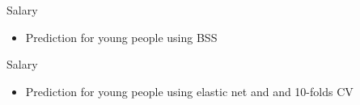 \documentclass[xcolor=dvipsnames]{beamer}
\begin{document}
\begin{frame}{\centerline{\huge\textcolor{bscuro}{Salary}}}
\begin{itemize}
	\item Prediction for young people using BSS 
\end{itemize}

\begin{figure}[!ht] 
	\centering
	\qquad
\end{figure}
\end{frame}

\begin{frame}{\centerline{\huge\textcolor{bscuro}{Salary}}}
\begin{itemize}
	\item Prediction for young people using elastic net and and 10-folds CV
\end{itemize}

\begin{figure}[!ht] 
	\centering
\end{figure}
\end{frame}
\end{document}
